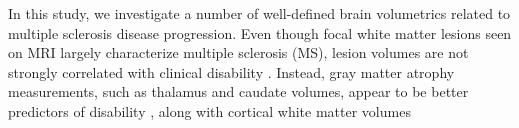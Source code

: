 In this study, we investigate a number of well-defined brain volumetrics related to multiple sclerosis disease progression. Even though focal white matter lesions seen on MRI largely characterize multiple sclerosis (MS), lesion volumes are not strongly correlated with clinical disability \cite{lesions1,lesions2,lesions3}. Instead, gray matter atrophy measurements, such as thalamus \cite{thal1,thal2,thal3,thal4} and caudate \cite{caud1,caud2} volumes, appear to be better predictors of disability \cite{gm1,gm2,gm3,gm4}, along with cortical white matter volumes \cite{white1}  %